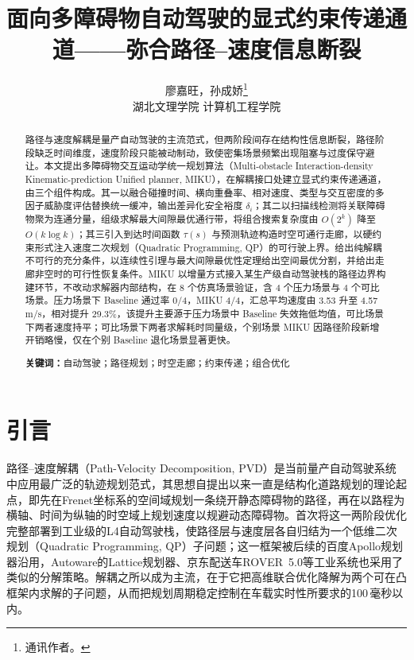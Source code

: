 \documentclass[a4paper,11pt]{ctexart}
\title{面向多障碍物自动驾驶的显式约束传递通道——弥合路径--速度信息断裂}
\author{廖嘉旺，孙成娇\thanks{通讯作者。}\\[2pt]\normalsize 湖北文理学院 计算机工程学院}
\date{}
\theoremstyle{definition}
\begin{document}
\maketitle

\begin{abstract}
\noindent
路径与速度解耦是量产自动驾驶的主流范式，但两阶段间存在结构性信息断裂，路径阶段缺乏时间维度，速度阶段只能被动制动，致使密集场景频繁出现阻塞与过度保守避让。本文提出多障碍物交互运动学统一规划算法（Multi-obstacle Interaction-density Kinematic-prediction Unified planner, MIKU），在解耦接口处建立显式约束传递通道，由三个组件构成。其一以融合碰撞时间、横向重叠率、相对速度、类型与交互密度的多因子威胁度评估替换统一缓冲，输出差异化安全裕度 $\delta_i$；其二以扫描线检测将关联障碍物聚为连通分量，组级求解最大间隙最优通行带，将组合搜索复杂度由 $O(2^k)$ 降至 $O(k\log k)$；其三引入到达时间函数 $\tau(s)$ 与预测轨迹构造时空可通行走廊，以硬约束形式注入速度二次规划（Quadratic Programming, QP）的可行驶上界。给出纯解耦不可行的充分条件，以连续性引理与最大间隙最优性定理给出空间最优分割，并给出走廊非空时的可行性恢复条件。MIKU 以增量方式接入某生产级自动驾驶栈的路径边界构建环节，不改动求解器内部结构，在 8 个仿真场景验证，含 4 个压力场景与 4 个可比场景。压力场景下 Baseline 通过率 0/4，MIKU 4/4，汇总平均速度由 3.53 升至 4.57 m/s，相对提升 29.3\%，该提升主要源于压力场景中 Baseline 失效拖低均值，可比场景下两者速度持平；可比场景下两者求解耗时同量级，个别场景 MIKU 因路径阶段新增开销略慢，仅在个别 Baseline 退化场景显著更快。

\vspace{0.5em}
\noindent\textbf{关键词：}自动驾驶；路径规划；时空走廊；约束传递；组合优化
\end{abstract}
\section{引言}
\label{sec:intro}

路径--速度解耦（Path-Velocity Decomposition, PVD）是当前量产自动驾驶系统中应用最广泛的轨迹规划范式，其思想自\citet{kant1986pvd}提出以来一直是结构化道路规划的理论起点，即先在Frenet坐标系的空间域规划一条绕开静态障碍物的路径，再在以路程为横轴、时间为纵轴的时空域上规划速度以规避动态障碍物。\citet{fan2018baidu}首次将这一两阶段优化完整部署到工业级的L4自动驾驶栈，使路径层与速度层各自归结为一个低维二次规划（Quadratic Programming, QP）子问题；这一框架被后续的百度Apollo规划器\citep{apollo2024}沿用，Autoware的Lattice规划器、京东配送车ROVER~5.0\citep{wang2022_jfr}等工业系统也采用了类似的分解策略。解耦之所以成为主流，在于它把高维联合优化降解为两个可在凸框架内求解的子问题，从而把规划周期稳定控制在车载实时性所要求的100\,毫秒以内\citep{fan2018baidu}。
\end{document}

